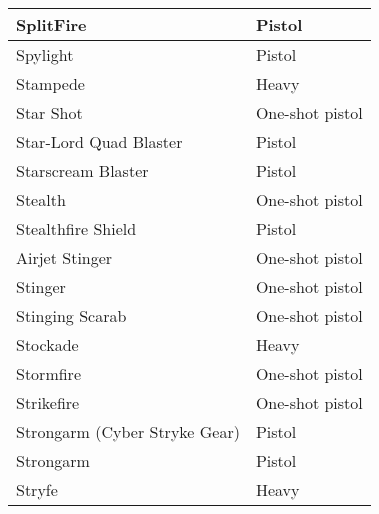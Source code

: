\documentclass{scrbook}
\begin{document}
\begin{table}
\begin{tabular}{|l|l|}
 \hline SplitFire & Pistol \\
 \hline Spylight & Pistol \\
 \hline Stampede & Heavy \\
 \hline Star Shot & One-shot pistol \\
 \hline Star-Lord Quad Blaster & Pistol \\
 \hline Starscream Blaster & Pistol \\
 \hline Stealth & One-shot pistol \\
 \hline Stealthfire Shield & Pistol \\
 \hline Airjet Stinger & One-shot pistol \\
 \hline Stinger & One-shot pistol \\
 \hline Stinging Scarab & One-shot pistol \\
 \hline Stockade & Heavy \\
 \hline Stormfire & One-shot pistol \\
 \hline Strikefire & One-shot pistol \\
 \hline Strongarm (Cyber Stryke Gear) & Pistol \\
 \hline Strongarm & Pistol \\
 \hline Stryfe & Heavy \\
 \hline \end{tabular}

\end{table}

	
\end{document}
